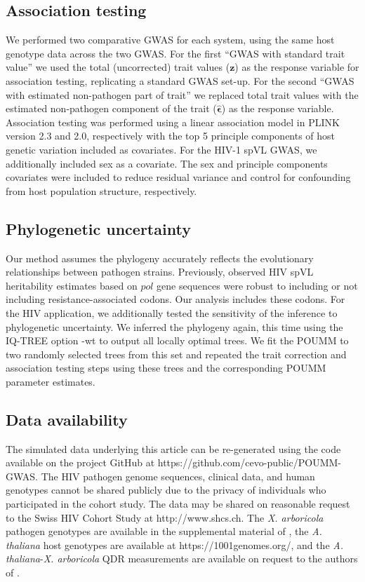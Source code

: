 \documentclass[11pt]{article}
\begin{document}
\begin{linenumbers}
\subsection*{Association testing}
We performed two comparative GWAS for each system, using the same host genotype data across the two GWAS. For the first ``GWAS with standard trait value'' we used the total (uncorrected) trait values ($\bm{z}$) as the response variable for association testing, replicating a standard GWAS set-up. For the second ``GWAS with estimated non-pathogen part of trait'' we replaced total trait values with the estimated non-pathogen component of the trait ($\hat{\bm{\epsilon}}$) as the response variable. Association testing was performed using a linear association model in PLINK version 2.3 and 2.0, respectively \citep{Chang2015} with the top 5 principle components of host genetic variation included as covariates. For the HIV-1 spVL GWAS, we additionally included sex as a covariate. The sex and principle components covariates were included to reduce residual variance and control for confounding from host population structure, respectively. 

\subsection*{Phylogenetic uncertainty}
Our method assumes the phylogeny accurately reflects the evolutionary relationships between pathogen strains. Previously, \cite{Hodcroft2014} observed HIV spVL heritability estimates based on $pol$ gene sequences were robust to including or not including resistance-associated codons. Our analysis includes these codons. For the HIV application, we additionally tested the sensitivity of the inference to phylogenetic uncertainty. We inferred the phylogeny again, this time using the IQ-TREE option -wt to output all locally optimal trees. We fit the POUMM to two randomly selected trees from this set and repeated the trait correction and association testing steps using these trees and the corresponding POUMM parameter estimates.

\subsection*{Data availability}
The simulated data underlying this article can be re-generated using the code available on the project GitHub at https://github.com/cevo-public/POUMM-GWAS. The HIV pathogen genome sequences, clinical data, and human genotypes cannot be shared publicly due to the privacy of individuals who participated in the cohort study. The data may be shared on reasonable request to the Swiss HIV Cohort Study at http://www.shcs.ch. The \emph{X. arboricola} pathogen genotypes are available in the supplemental material of \citep{Wang2018Two-wayGenomes}, the \emph{A. thaliana} host genotypes are available at https://1001genomes.org/, and the \emph{A. thaliana}-\emph{X. arboricola} QDR measurements are available on request to the authors of \citep{Wang2018Two-wayGenomes}.


\end{linenumbers}
\end{document}
